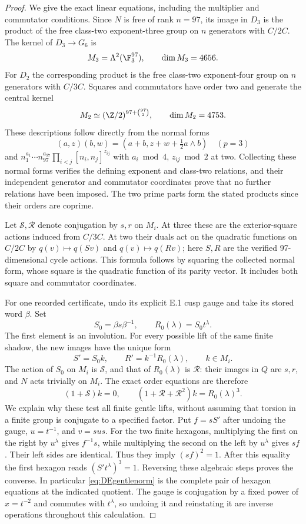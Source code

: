 \begin{proof}
We give the exact linear equations, including the multiplier and
commutator conditions. Since $N$ is free of rank $n=97$, its image
in $D_3$ is the product of the free class-two exponent-three group
on $n$ generators with $C/2C$. The kernel of $D_3\to G_6$ is
\[
 M_3=\Lambda^2(\F_3^{97}),\qquad \dim M_3=4656.
\]
For $D_2$ the corresponding product is the free class-two
exponent-four group on $n$ generators with $C/3C$. Squares and
commutators have order two and generate the central kernel
\[
 M_2\simeq(\Z/2)^{97+\binom{97}{2}},\qquad\dim M_2=4753.
\]
These descriptions follow directly from the normal forms
\[
 (a,z)(b,w)=(a+b,z+w+\tfrac12a\wedge b)\quad(p=3)
\]
and
$n_1^{a_1}\cdots n_{97}^{a_{97}}\prod_{i<j}[n_i,n_j]^{z_{ij}}$
with $a_i\bmod4$, $z_{ij}\bmod2$ at two. Collecting these normal
forms verifies the defining exponent and class-two relations, and
their independent generator and commutator coordinates prove that
no further relations have been imposed. The two prime parts form
the stated products since their orders are coprime.

Let $\mathcal S,\mathcal R$ denote conjugation by $s,r$ on $M_i$.
At three these are the exterior-square actions induced from $C/3C$.
At two their duals act on the quadratic functions on $C/2C$ by
$q(v)\mapsto q(Sv)$ and $q(v)\mapsto q(Rv)$; here $S,R$ are the
verified 97-dimensional cycle actions. This formula follows by
squaring the collected normal form, whose square is the quadratic
function of its parity vector. It includes both square and
commutator coordinates.

For one recorded certificate, undo its explicit E.1 cusp gauge and
take its stored word $\beta$. Set
\[
 S_0=\beta s\beta^{-1},\qquad R_0(\lambda)=S_0t^\lambda.
\]
The first element is an involution. For every possible lift of the
same finite shadow, the new images have the unique form
\[
 S'=S_0k,\qquad R'=k^{-1}R_0(\lambda),\qquad k\in M_i.
\]
The action of $S_0$ on $M_i$ is $\mathcal S$, and that of
$R_0(\lambda)$ is $\mathcal R$: their images in $Q$ are $s,r$,
and $N$ acts trivially on $M_i$.
The exact order equations are therefore
\begin{equation}\label{eq:DEgentlenorm}
 (1+\mathcal S)k=0,\qquad
 (1+\mathcal R+\mathcal R^2)k=R_0(\lambda)^3.
\end{equation}
We explain why these test all finite gentle lifts, without assuming
that torsion in a finite group is conjugate to a specified factor.
Put $f=sS'$ after undoing the gauge, $u=t^{-1}$, and $v=sus$.
For the two finite hexagons, multiplying the first on the right by
$u^\lambda$ gives $f^{-1}s$, while multiplying the second on the
left by $u^\lambda$ gives $sf$. Their left sides are identical.
Thus they imply $(sf)^2=1$. After this equality the first
hexagon reads $(S't^\lambda)^3=1$. Reversing these algebraic steps
proves the converse. In particular \eqref{eq:DEgentlenorm} is the
complete pair of hexagon equations at the indicated quotient.
The gauge is conjugation by a fixed power of $x=t^{-2}$ and
commutes with $t^\lambda$, so undoing it and reinstating it are
inverse operations throughout this calculation.


\end{proof}
